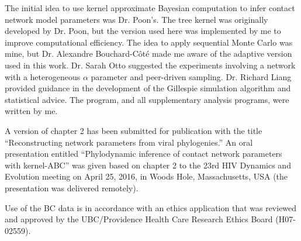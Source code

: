 The initial idea to use kernel approximate Bayesian computation to infer
contact network model parameters was Dr. Poon's. The tree kernel was originally
developed by Dr. Poon, but the version used here was implemented by me to
improve computational efficiency. The idea to apply sequential Monte Carlo was
mine, but Dr. Alexandre Bouchard-C\^ot\'e made me aware of the adaptive version
used in this work. Dr. Sarah Otto suggested the experiments involving a network
with a heterogeneous $\alpha$ parameter and peer-driven sampling. Dr. Richard
Liang provided guidance in the development of the Gillespie simulation
algorithm and statistical advice. The  program, and all
supplementary analysis programs, were written by me.

A version of chapter 2 has been submitted for publication with the title
``Reconstructing network parameters from viral phylogenies.'' An oral
presentation entitled ``Phylodynamic inference of contact network parameters
with kernel-ABC'' was given based on chapter 2 to the 23rd HIV Dynamics and
Evolution meeting on April 25, 2016, in Woods Hole, Massachusetts, USA (the
presentation was delivered remotely). 

Use of the BC data is in accordance with an ethics application that was
reviewed and approved by the UBC/Providence Health Care Research Ethics Board
(H07-02559).
